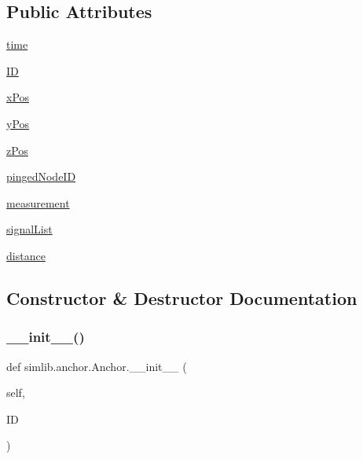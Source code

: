 \subsection*{Public Attributes}
\begin{DoxyCompactItemize}
\item 
\mbox{\hyperlink{classsimlib_1_1anchor_1_1_anchor_a96058beb8928e45282047c32b54c91b0}{time}}
\item 
\mbox{\hyperlink{classsimlib_1_1anchor_1_1_anchor_a99d8dec757fbc70270e99c9c58c2af01}{ID}}
\item 
\mbox{\hyperlink{classsimlib_1_1anchor_1_1_anchor_a25728525e949903415a91e93835f25d1}{x\+Pos}}
\item 
\mbox{\hyperlink{classsimlib_1_1anchor_1_1_anchor_a8c2832ed33668293e7565ac92df91c09}{y\+Pos}}
\item 
\mbox{\hyperlink{classsimlib_1_1anchor_1_1_anchor_a9fe20f5528a2b23048ba1276fc20b916}{z\+Pos}}
\item 
\mbox{\hyperlink{classsimlib_1_1anchor_1_1_anchor_a0a3c5084cf1372dca4bf2e3e2929c70b}{pinged\+Node\+ID}}
\item 
\mbox{\hyperlink{classsimlib_1_1anchor_1_1_anchor_abba6bd8618826a157c3dc6449504b971}{measurement}}
\item 
\mbox{\hyperlink{classsimlib_1_1anchor_1_1_anchor_a455a6b6556f9daddf7ad9960b22378ab}{signal\+List}}
\item 
\mbox{\hyperlink{classsimlib_1_1anchor_1_1_anchor_a9ddf34bbd3d7e3ca151416b5d1bfea45}{distance}}
\end{DoxyCompactItemize}


\subsection{Constructor \& Destructor Documentation}
\mbox{\label{classsimlib_1_1anchor_1_1_anchor_a7f9c8d88a2b75c6906c7b3c407122253}} 
\subsubsection{\texorpdfstring{\+\_\+\+\_\+init\+\_\+\+\_\+()}{\_\_init\_\_()}}
{\footnotesize\ttfamily def simlib.\+anchor.\+Anchor.\+\_\+\+\_\+init\+\_\+\+\_\+ (\begin{DoxyParamCaption}\item[{}]{self,  }\item[{}]{ID }\end{DoxyParamCaption})}



